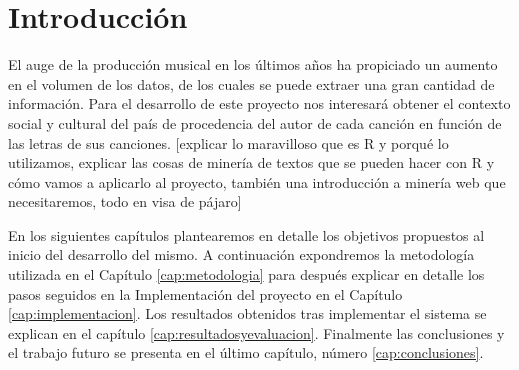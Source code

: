 \chapter{Introducción}
\label{cap:introduccion}

El auge de la producción musical en los últimos años ha propiciado un aumento en el volumen de los datos, de los cuales se puede extraer una gran cantidad de información. Para el desarrollo de este proyecto nos interesará obtener el contexto social y cultural del país de procedencia del autor de cada canción en función de las letras de sus canciones. [explicar lo maravilloso que es R y porqué lo utilizamos, explicar las cosas de minería de textos que se pueden hacer con R y cómo vamos a aplicarlo al proyecto, también una introducción a minería web que necesitaremos, todo en visa de pájaro]

En los siguientes capítulos plantearemos en detalle los objetivos propuestos al inicio del desarrollo del mismo. A continuación expondremos la metodología utilizada en el Capítulo \ref{cap:metodologia} para después explicar en detalle los pasos seguidos en la Implementación del proyecto en el Capítulo \ref{cap:implementacion}. Los resultados obtenidos tras implementar el sistema se explican en el capítulo \ref{cap:resultadosyevaluacion}. Finalmente las conclusiones y el trabajo futuro se presenta en el último capítulo, número \ref{cap:conclusiones}.